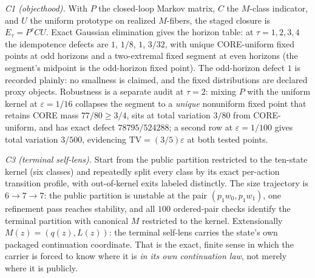 \documentclass[11pt]{article}
\theoremstyle{definition}
\begin{document}
\emph{C1 (objecthood).} With $P$ the closed-loop Markov matrix, $C$ the
$M$-class indicator, and $U$ the uniform prototype on realized $M$-fibers,
the staged closure is $E_\tau = P^\tau C U$. Exact Gaussian elimination gives
the horizon table: at $\tau = 1,2,3,4$ the idempotence defects are $1$,
$1/8$, $1$, $3/32$, with unique CORE-uniform fixed points at odd horizons and
a two-extremal fixed segment at even horizons (the segment's midpoint is the
odd-horizon fixed point). The odd-horizon defect $1$ is recorded plainly:
no smallness is claimed, and the fixed distributions are declared proxy
objects.
Robustness is a separate audit at $\tau=2$: mixing $P$ with the uniform
kernel at $\varepsilon = 1/16$ collapses the segment to a \emph{unique}
nonuniform fixed point that retains CORE mass $77/80 \ge 3/4$, sits at total
variation $3/80$ from CORE-uniform, and has exact defect $78795/524288$; a
second row at $\varepsilon = 1/100$ gives total variation $3/500$, evidencing
$\mathrm{TV} = (3/5)\varepsilon$ at both tested points.

\emph{C3 (terminal self-lens).} Start from the public partition restricted to
the ten-state kernel (six classes) and repeatedly split every class by its
exact per-action transition profile, with out-of-kernel exits labeled
distinctly. The size trajectory is $6 \to 7 \to 7$: the public partition is
unstable at the pair $(p_1 w_0, p_1 w_1)$, one refinement pass reaches
stability, and all $100$ ordered-pair checks identify the terminal partition
with canonical $M$ restricted to the kernel. Extensionally
$M(z) = (q(z), L(z))$: the terminal self-lens carries the state's own packaged
continuation coordinate. That is the exact, finite sense in which the carrier
is forced to know where it is \emph{in its own continuation law}, not merely
where it is publicly.
\end{document}
